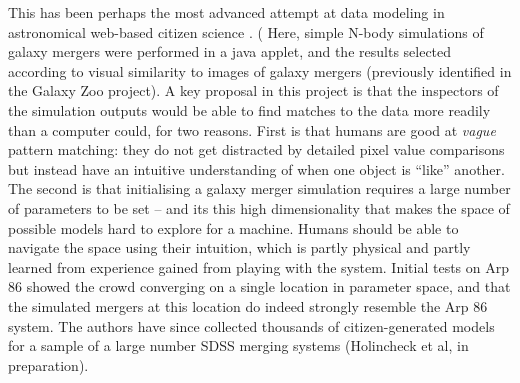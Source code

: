 \documentclass{ar2e}
\begin{document}
 This has been perhaps the most advanced attempt
at data modeling in  astronomical web-based citizen science
\citep{HolincheckEtal2010,WallinEtal2010}. ( Here, simple
N-body simulations of galaxy mergers were performed in a java applet, and the
results selected according to visual similarity to images of galaxy mergers
(previously identified in the Galaxy Zoo project). A key proposal in this
project is that the inspectors of the simulation outputs would be able to find
matches to the data more readily than a computer could, for two reasons. First
is that humans are good at {\it vague} pattern matching: they do not get
distracted by detailed pixel value comparisons but instead have an intuitive
understanding of when one object is ``like'' another. The second is that
initialising a galaxy merger simulation requires a large number of parameters to
be set -- and its this high dimensionality  that makes the space of possible
models hard to explore for a machine. Humans should be able to navigate the
space using their intuition, which is partly physical and partly learned from
experience gained from playing with the system. Initial tests on Arp 86  showed
the crowd converging on a single location in parameter space, and that the
simulated mergers at this location do indeed strongly resemble the Arp 86
system. The authors have since collected thousands of citizen-generated models
for a sample of a large number SDSS merging systems (Holincheck et al, in
preparation). 

\end{document}
